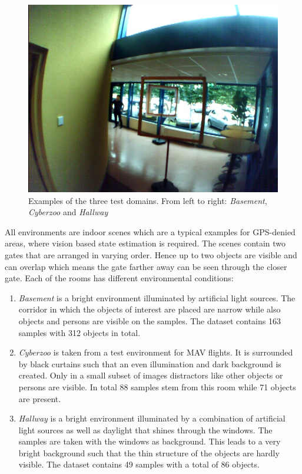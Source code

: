 \begin{figure}
\begin{minipage}{0.3\textwidth}
	\end{minipage}\hfill
	\begin{minipage}{0.3\textwidth}
		\includegraphics[width=\textwidth]{fig/hallway}
	\end{minipage}
	\caption{Examples of the three test domains. From left to right: \textit{Basement}, \textit{Cyberzoo} and \textit{Hallway}}
	\label{fig:example_real_set}
\end{figure}

All environments are indoor scenes which are a typical examples for GPS-denied areas, where vision based state estimation is required. The scenes contain two gates that are arranged in varying order. Hence up to two objects are visible and can overlap which means the gate farther away can be seen through the closer gate. Each of the rooms has different environmental conditions:
\begin{enumerate}
	\item \textit{Basement} is a bright environment illuminated by artificial light sources. The corridor in which the objects of interest are placed are narrow while also objects and persons are visible on the samples. The dataset contains 163 samples with 312 objects in total.
	\item \textit{Cyberzoo} is taken from a test environment for \ac{MAV} flights.  It is surrounded by black curtains such that an even illumination and dark background is created. Only in a small subset of images distractors like other objects or persons are visible. In total 88 samples stem from this room while 71 objects are present.
	\item \textit{Hallway} is a bright environment illuminated by a combination of artificial light sources as well as daylight that shines through the windows. The samples are taken with the windows as background. This leads to a very bright background such that the thin structure of the objects are hardly visible. The dataset contains 49 samples with a total of 86 objects.
\end{enumerate}


